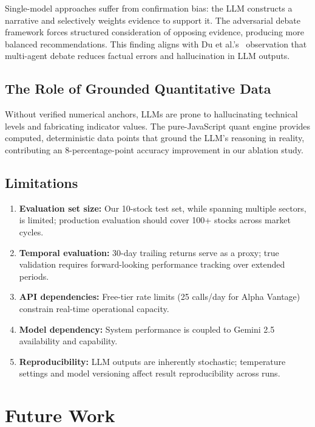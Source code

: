 \documentclass[conference]{IEEEtran}
\begin{document}
Single-model approaches suffer from confirmation bias: the LLM constructs a narrative and selectively weights evidence to support it. The adversarial debate framework forces structured consideration of opposing evidence, producing more balanced recommendations. This finding aligns with Du et al.'s~\cite{du2023debate} observation that multi-agent debate reduces factual errors and hallucination in LLM outputs.

\subsection{The Role of Grounded Quantitative Data}

Without verified numerical anchors, LLMs are prone to hallucinating technical levels and fabricating indicator values. The pure-JavaScript quant engine provides computed, deterministic data points that ground the LLM's reasoning in reality, contributing an 8-percentage-point accuracy improvement in our ablation study.

\subsection{Limitations}

\begin{enumerate}
\item \textbf{Evaluation set size:} Our 10-stock test set, while spanning multiple sectors, is limited; production evaluation should cover 100+ stocks across market cycles.
\item \textbf{Temporal evaluation:} 30-day trailing returns serve as a proxy; true validation requires forward-looking performance tracking over extended periods.
\item \textbf{API dependencies:} Free-tier rate limits (25 calls/day for Alpha Vantage) constrain real-time operational capacity.
\item \textbf{Model dependency:} System performance is coupled to Gemini 2.5 availability and capability.
\item \textbf{Reproducibility:} LLM outputs are inherently stochastic; temperature settings and model versioning affect result reproducibility across runs.
\end{enumerate}


\section{Future Work}
\label{sec:future}
\end{document}
